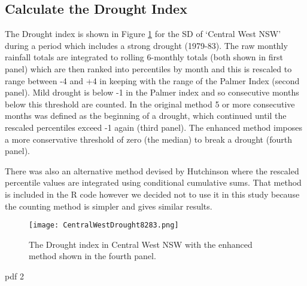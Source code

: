 \documentclass[a4paper]{article}                %
\begin{document}

\subsection{Calculate the Drought Index}

        The Drought index is shown in Figure \ref{fig:CentralWestDrought8283.png} for the SD of `Central West NSW' during a period which includes a strong drought (1979-83). The raw monthly rainfall totals are integrated to rolling 6-monthly totals (both shown in first panel) which are then ranked into percentiles by month and this is rescaled to range between -4 and +4 in keeping with the range of the Palmer Index \cite{Palmer1965} (second panel).  Mild drought is below -1 in the Palmer index and so consecutive months below this threshold are counted. In the original method 5 or more consecutive months was defined as the beginning of a drought, which continued until the rescaled percentiles exceed -1 again  (third panel).  The enhanced method imposes a more conservative threshold of zero (the median) to break a drought (fourth panel).

        There was also an alternative method devised by Hutchinson where the rescaled percentile values are integrated using conditional cumulative sums.  That method is included in the R code however we decided not to use it in this study because the counting method is simpler and gives similar results.

        \begin{figure}[!h]
        \centering
        \texttt{[image: CentralWestDrought8283.png]}
        \caption{The Drought index in Central West NSW with the enhanced method shown in the fourth panel.}
        \label{fig:CentralWestDrought8283.png}
        \end{figure}


\begin{Schunk}
\begin{Soutput}
pdf 
  2 
\end{Soutput}
\end{Schunk}
\end{document}
